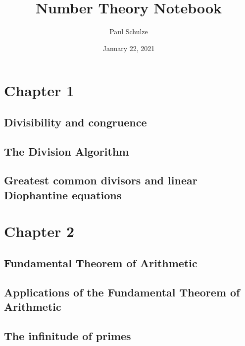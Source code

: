 \documentclass{article}
\title{Number Theory Notebook}
\author{Paul Schulze}
\date{January 22, 2021}
\numberwithin{equation}{thm}
\begin{document}
\maketitle



\section{Chapter 1}


\subsection*{Divisibility and congruence}




\subsection*{The Division Algorithm}




\subsection*{Greatest common divisors and linear Diophantine equations}





\pagebreak



\section{Chapter 2}


\subsection*{Fundamental Theorem of Arithmetic}




\subsection*{Applications of the Fundamental Theorem of Arithmetic}




\subsection*{The infinitude of primes}
\end{document}
